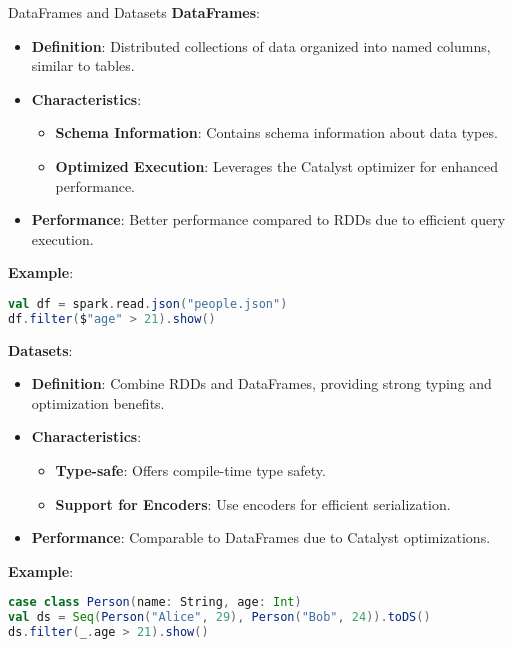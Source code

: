 \documentclass[aspectratio=169]{beamer}
\begin{document}
\begin{frame}[fragile]{DataFrames and Datasets}
    \textbf{DataFrames}:
    \begin{itemize}
        \item \textbf{Definition}: Distributed collections of data organized into named columns, similar to tables.
        \item \textbf{Characteristics}:
        \begin{itemize}
            \item \textbf{Schema Information}: Contains schema information about data types.
            \item \textbf{Optimized Execution}: Leverages the Catalyst optimizer for enhanced performance.
        \end{itemize}
        \item \textbf{Performance}: Better performance compared to RDDs due to efficient query execution.
    \end{itemize}

    \textbf{Example}:
    \begin{lstlisting}[language=scala]
val df = spark.read.json("people.json")
df.filter($"age" > 21).show()
    \end{lstlisting}    

    \textbf{Datasets}:
    \begin{itemize}
        \item \textbf{Definition}: Combine RDDs and DataFrames, providing strong typing and optimization benefits.
        \item \textbf{Characteristics}:
        \begin{itemize}
            \item \textbf{Type-safe}: Offers compile-time type safety.
            \item \textbf{Support for Encoders}: Use encoders for efficient serialization.
        \end{itemize}
        \item \textbf{Performance}: Comparable to DataFrames due to Catalyst optimizations.
    \end{itemize}
    
    \textbf{Example}:
    \begin{lstlisting}[language=scala]
case class Person(name: String, age: Int)
val ds = Seq(Person("Alice", 29), Person("Bob", 24)).toDS()
ds.filter(_.age > 21).show()
    \end{lstlisting}
\end{frame}
\end{document}
